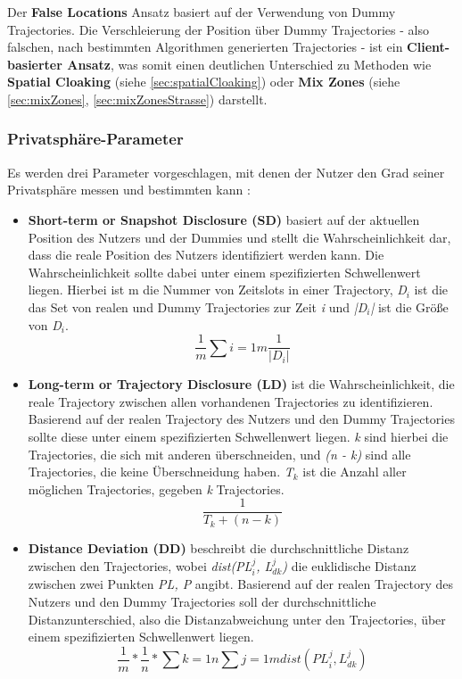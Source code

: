 Der \textbf{False Locations} Ansatz basiert auf der Verwendung von Dummy Trajectories. Die Verschleierung der Position über Dummy Trajectories - also falschen, nach bestimmten Algorithmen generierten Trajectories - ist ein \textbf{Client-basierter Ansatz}, was somit einen deutlichen Unterschied zu Methoden wie \textbf{Spatial Cloaking} (siehe \ref{sec:spatialCloaking}) oder \textbf{Mix Zones} (siehe \ref{sec:mixZones}, \ref{sec:mixZonesStrasse}) darstellt.

\subsubsection{Privatsphäre-Parameter} \label{subsubsection:dgparameter}
Es werden drei Parameter vorgeschlagen, mit denen der Nutzer den Grad seiner Privatsphäre messen und bestimmten kann \cite{You2007, Lei2012}:
\begin{itemize}
	\item \textbf{Short-term or Snapshot Disclosure (SD)} basiert auf der aktuellen Position des Nutzers und der Dummies und stellt die Wahrscheinlichkeit dar, dass die reale Position des Nutzers identifiziert werden kann. Die Wahrscheinlichkeit sollte dabei unter einem spezifizierten Schwellenwert liegen. 
	Hierbei ist m die Nummer von Zeitslots in einer Trajectory, \textit{D$_{i}$} ist die das Set von realen und Dummy Trajectories zur Zeit \textit{i} und \textit{|D$_{i}$|} ist die Größe von \textit{D$_{i}$}.
	\begin{equation}
	\label{equation:SD}
	\frac{1}{m} \sum{i=1}{m}{\frac{1}{\left\lvert D_{i} \right\rvert}}
	\end{equation}	
	\item \textbf{Long-term or Trajectory Disclosure (LD)} ist die Wahrscheinlichkeit, die reale Trajectory zwischen allen vorhandenen Trajectories zu identifizieren. Basierend auf der realen Trajectory des Nutzers und den Dummy Trajectories sollte diese unter einem spezifizierten Schwellenwert liegen. 
	\textit{k} sind hierbei die Trajectories, die sich mit anderen überschneiden, und \textit{(n - k)} sind alle Trajectories, die keine Überschneidung haben. \textit{T$_{k}$} ist die Anzahl aller möglichen Trajectories, gegeben \textit{k} Trajectories.
	\begin{equation}
	\label{equation:LD}
	\frac{1}{T_{k} + \left( n - k \right)}
	\end{equation}	
	\item \textbf{Distance Deviation (DD)} beschreibt die durchschnittliche Distanz zwischen den Trajectories, wobei \textit{dist(PL$_{i}^{j}$, L$_{dk}^{j}$)} die euklidische Distanz zwischen zwei Punkten \textit{PL, P} angibt. Basierend auf der realen Trajectory des Nutzers und den Dummy Trajectories soll der durchschnittliche Distanzunterschied, also die Distanzabweichung unter den Trajectories, über einem spezifizierten Schwellenwert liegen.
	\begin{equation}
	\label{equation:DD}
	\frac{1}{m} * \frac{1}{n} * \sum{k=1}{n}{\sum{j=1}{m}{dist\left(PL_{i}^{j}, L_{dk}^{j}\right)}}
	\end{equation}	
\end{itemize}

